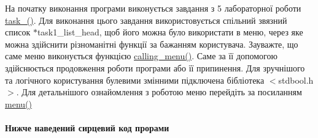 На початку виконання програми виконується завдання з 5 лабораторної роботи \hyperlink{main_8c_a581b30e0dc7f2e359199f4981fcffbab}{task\+\_()}. Для виконання цього завдання використовується спільний зв\textquotesingle{}язний список {\ttfamily $\ast$task1\+\_\+list\+\_\+head}, щоб його можна було використати в меню, через яке можна здійснити різноманітні функції за бажанням користувача. Зауважте, що саме меню виконується функцією \hyperlink{main_8c_af06a9f0e060c21d8adec2d33546e07c2}{calling\+\_\+menu()}. Саме за її допомогою здійснюється продовження роботи програми або її припинення. Для зручнішого та логічного користування булевими змінними підключена бібліотека $<$stdbool.\+h$>$. Для детальнішого ознайомлення з роботою меню перейдіть за посиланням \hyperlink{main_8c_afd62a5de84ed382e0c4b2ff7f788e6d9}{menu()} \paragraph*{Нижче наведений сирцевий код прорами}


